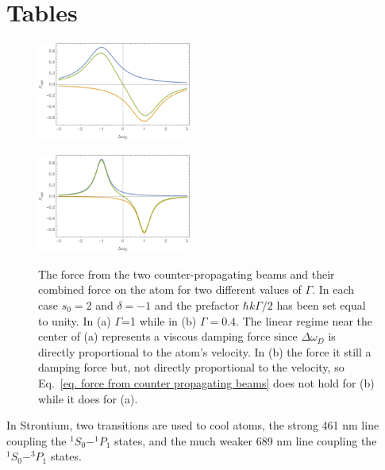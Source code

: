 \documentclass[../../main.tex]{subfiles}
\begin{document}
\section{Tables}
\begin{figure}[tbp]
    \begin{subfloat}[]
        {\includegraphics[width=0.45\textwidth]{Optical Molasses force1}
        \label{fig. Optical Molasses force1}}           
    \end{subfloat}
    \hfill
    \begin{subfloat}[]
        {\includegraphics[width=0.45\textwidth]{Optical Molasses force2}
        \label{fig. Optical Molasses force2}}           
    \end{subfloat}
    \caption{The force from the two counter-propagating beams and their combined force on the atom for two different values of $\Gamma$. In each case $s_0=2$ and $\delta=-1$ and the prefactor $\hbar k\Gamma/2$ has been set equal to unity. In (a) $\Gamma$=1 while in (b) $\Gamma=0.4$. The linear regime near the center of (a) represents a viscous damping force since $\Delta\omega_D$ is directly proportional to the atom's velocity. In (b) the force it still a damping force but, not directly proportional to the velocity, so Eq.~\ref{eq. force from counter propagating beams} does not hold for (b) while it does for (a).}
    \label{fig. Optical Molasses forces}
\end{figure}


\newpage
In Strontium, two transitions are used to cool atoms, the strong 461 nm line coupling the $^1S_0-^1P_1$ states, and the much weaker 689 nm line coupling the $^1S_0-^3P_1$ states. 
\end{document}
